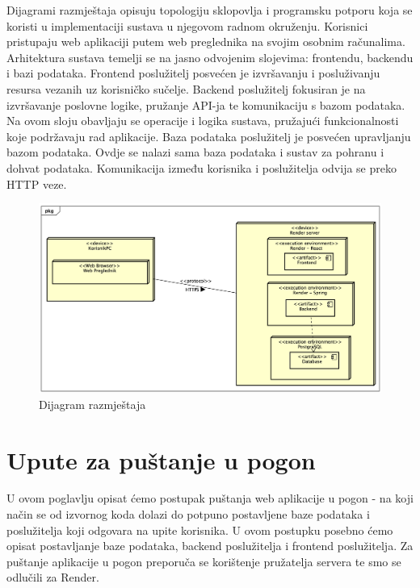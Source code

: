 			Dijagrami razmještaja opisuju topologiju sklopovlja i programsku potporu koja se koristi u implementaciji sustava u njegovom radnom okruženju. Korisnici pristupaju web aplikaciji putem web preglednika na svojim osobnim računalima. Arhitektura sustava temelji se na jasno odvojenim slojevima: frontendu, backendu i bazi podataka. 
			Frontend poslužitelj posvećen je izvršavanju i posluživanju resursa vezanih uz korisničko sučelje. Backend poslužitelj fokusiran  je na izvršavanje poslovne logike, pružanje API-ja te komunikaciju s bazom podataka. Na ovom sloju obavljaju se operacije i logika sustava, pružajući funkcionalnosti koje podržavaju rad aplikacije. Baza podataka poslužitelj je posvećen upravljanju bazom podataka. Ovdje se nalazi sama baza podataka i sustav za pohranu i dohvat podataka.  Komunikacija između korisnika i poslužitelja odvija se preko HTTP veze.
			 
			 \begin{figure}[H]
			 	\includegraphics[scale=0.45]{dijagrami/dijagramRazmjestaja.png}
			 	\centering
			 	\caption{Dijagram razmještaja}
			 	\label{fig:promjene}
			 \end{figure}
			
			\eject 
		
		\section{Upute za puštanje u pogon}
		
			U ovom poglavlju opisat ćemo postupak puštanja web aplikacije u pogon - na koji način se od izvornog koda dolazi do potpuno postavljene baze podataka i poslužitelja koji odgovara na upite korisnika. U ovom postupku posebno ćemo opisat postavljanje baze podataka, backend poslužitelja i frontend poslužitelja. Za puštanje aplikacije u pogon preporuča se korištenje pružatelja servera te smo se odlučili za Render.
			
